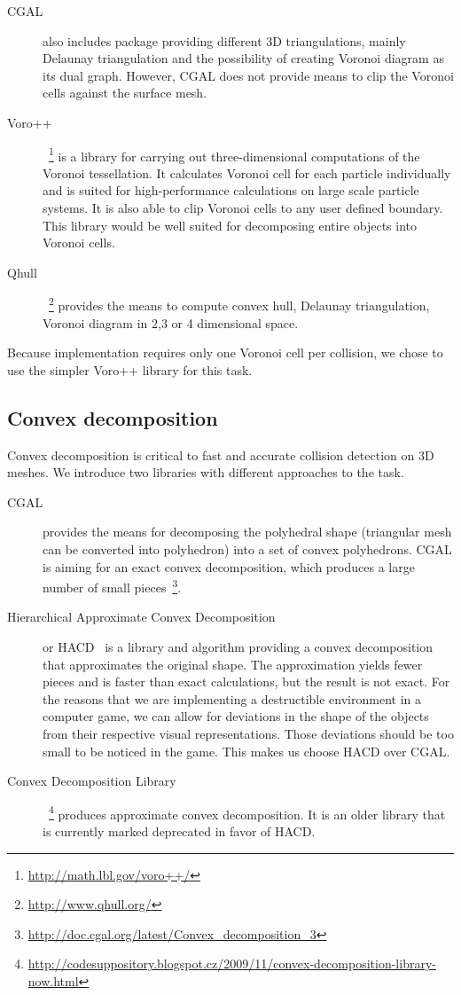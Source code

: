 \begin{description}
\item[CGAL] also includes package providing different 3D triangulations, mainly Delaunay triangulation and the possibility of creating Voronoi diagram as its dual graph. However, CGAL does not provide means to clip the Voronoi cells against the surface mesh.

\item[Voro++]~\footnote{\url{http://math.lbl.gov/voro++/}} is a library for carrying out three-dimensional computations of the Voronoi tessellation. It calculates Voronoi cell for each particle individually and is suited for high-performance calculations on large scale particle systems. It is also able to clip Voronoi cells to any user defined boundary. This library would be well suited for decomposing entire objects into Voronoi cells. 

\item[Qhull]~\footnote{\url{http://www.qhull.org/}} provides the means to compute convex hull, Delaunay triangulation, Voronoi diagram in 2,3 or 4 dimensional space.

\end{description}
Because implementation requires only one Voronoi cell per collision, we chose to use the simpler Voro++ library for this task. 


\subsection{Convex decomposition}
\label{sec:decompositionLib}
Convex decomposition is critical to fast and accurate collision detection on 3D meshes. We introduce two libraries with different approaches to the task.
\begin{description}
\item[CGAL] provides the means for decomposing the polyhedral shape (triangular mesh can be converted into polyhedron) into a set of convex polyhedrons. CGAL is aiming for an exact convex decomposition, which produces a large number of small pieces~\footnote{\url{http://doc.cgal.org/latest/Convex\_decomposition\_3}}.

\item[Hierarchical Approximate Convex Decomposition] or HACD~\cite{HACD} is a library and algorithm providing a convex decomposition that approximates the original shape. The approximation yields fewer pieces and is faster than exact calculations, but the result is not exact. For the reasons that we are implementing a destructible environment in a computer game, we can allow for deviations in the shape of the objects from their respective visual representations. Those deviations should be too small to be noticed in the game. This makes us choose HACD over CGAL.

\item[Convex Decomposition Library]~\footnote{\scriptsize\url{http://codesuppository.blogspot.cz/2009/11/convex-decomposition-library-now.html}} produces approximate convex decomposition. It is an older library that is currently marked deprecated in favor of HACD. 
\end{description}

